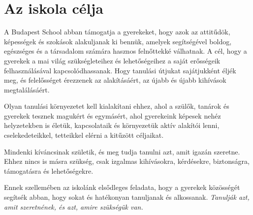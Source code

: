 \section{Az iskola célja}
\label{sec:iskola_celja}

A Budapest School abban támogatja a gyerekeket, hogy azok az
attitűdök, képességek és szokások alakuljanak ki bennük, amelyek segítségével
boldog, egészséges és a társadalom számára hasznos felnőttekké válhatnak. A
cél, hogy a gyerekek a mai világ szükségleteihez és lehetőségeihez a saját
erősségeik felhasználásával kapcsolódhassanak.	Hogy tanulási útjukat
sajátjukként éljék meg, és felelősséget érezzenek az alakításáért, az újabb és
újabb kihívások megtalálásáért.

Olyan tanulási környezetet kell kialakítani ehhez, ahol a szülők, tanárok és
gyerekek tesznek magukért és egymásért, ahol gyerekeink képesek nehéz
helyzetekben is életük, kapcsolataik és környezetük aktív alakítói lenni,
cselekedeteikkel, tetteikkel elérni a kitűzött céljaikat.

Mindenki kíváncsinak születik, és meg tudja tanulni azt, amit
igazán szeretne. Ehhez nincs is másra szükség, csak izgalmas kihívásokra, kérdésekre,
biztonságra, támogatásra és lehetőségekre.

Ennek szellemében az iskolánk elsődleges feladata, hogy a gyerekek közösségét
segítsék abban, hogy sokat és hatékonyan tanuljanak és alkossanak.
\emph{Tanulják azt, amit szeretnének, és azt, amire szükségük van.}
